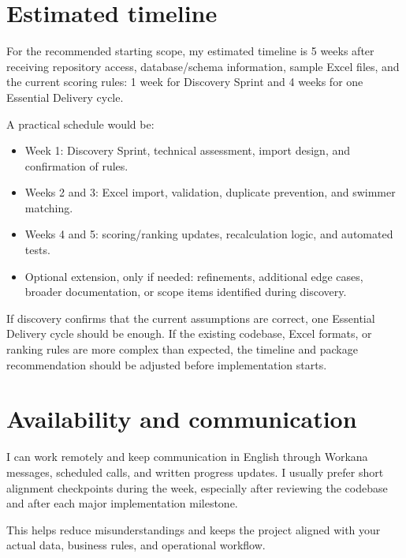 \documentclass[11pt,a4paper]{article}
\begin{document}
\section*{Estimated timeline}

For the recommended starting scope, my estimated timeline is 5 weeks after receiving repository access, database/schema information, sample Excel files, and the current scoring rules: 1 week for Discovery Sprint and 4 weeks for one Essential Delivery cycle.\par

A practical schedule would be:\par

\begin{itemize}
\item Week 1: Discovery Sprint, technical assessment, import design, and confirmation of rules.
\item Weeks 2 and 3: Excel import, validation, duplicate prevention, and swimmer matching.
\item Weeks 4 and 5: scoring/ranking updates, recalculation logic, and automated tests.
\item Optional extension, only if needed: refinements, additional edge cases, broader documentation, or scope items identified during discovery.
\end{itemize}

If discovery confirms that the current assumptions are correct, one Essential Delivery cycle should be enough. If the existing codebase, Excel formats, or ranking rules are more complex than expected, the timeline and package recommendation should be adjusted before implementation starts.\par

\section*{Availability and communication}

I can work remotely and keep communication in English through Workana messages, scheduled calls, and written progress updates. I usually prefer short alignment checkpoints during the week, especially after reviewing the codebase and after each major implementation milestone.\par

This helps reduce misunderstandings and keeps the project aligned with your actual data, business rules, and operational workflow.\par
\end{document}
